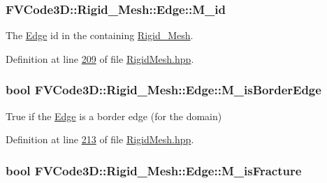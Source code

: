 \subsubsection[{\texorpdfstring{M\+\_\+id}{M_id}}]{ F\+V\+Code3\+D\+::\+Rigid\+\_\+\+Mesh\+::\+Edge\+::\+M\+\_\+id\hspace{0.3cm}{\ttfamily [protected]}}\hypertarget{classFVCode3D_1_1Rigid__Mesh_1_1Edge_a534f18f2319df147a43ee837d41dddfe}{}\label{classFVCode3D_1_1Rigid__Mesh_1_1Edge_a534f18f2319df147a43ee837d41dddfe}


The \hyperlink{classFVCode3D_1_1Rigid__Mesh_1_1Edge}{Edge} id in the containing \hyperlink{classFVCode3D_1_1Rigid__Mesh}{Rigid\+\_\+\+Mesh}. 



Definition at line \hyperlink{RigidMesh_8hpp_source_l00209}{209} of file \hyperlink{RigidMesh_8hpp_source}{Rigid\+Mesh.\+hpp}.

\subsubsection[{\texorpdfstring{M\+\_\+is\+Border\+Edge}{M_isBorderEdge}}]{\setlength{\rightskip}{0pt plus 5cm}bool F\+V\+Code3\+D\+::\+Rigid\+\_\+\+Mesh\+::\+Edge\+::\+M\+\_\+is\+Border\+Edge\hspace{0.3cm}{\ttfamily [protected]}}\hypertarget{classFVCode3D_1_1Rigid__Mesh_1_1Edge_af97600008d97c4db6f57fba531d8cd5c}{}\label{classFVCode3D_1_1Rigid__Mesh_1_1Edge_af97600008d97c4db6f57fba531d8cd5c}


True if the \hyperlink{classFVCode3D_1_1Rigid__Mesh_1_1Edge}{Edge} is a border edge (for the domain) 



Definition at line \hyperlink{RigidMesh_8hpp_source_l00213}{213} of file \hyperlink{RigidMesh_8hpp_source}{Rigid\+Mesh.\+hpp}.

\subsubsection[{\texorpdfstring{M\+\_\+is\+Fracture}{M_isFracture}}]{\setlength{\rightskip}{0pt plus 5cm}bool F\+V\+Code3\+D\+::\+Rigid\+\_\+\+Mesh\+::\+Edge\+::\+M\+\_\+is\+Fracture\hspace{0.3cm}{\ttfamily [protected]}}\hypertarget{classFVCode3D_1_1Rigid__Mesh_1_1Edge_ae0356f38073c9139078e3caa7a87c587}{}\label{classFVCode3D_1_1Rigid__Mesh_1_1Edge_ae0356f38073c9139078e3caa7a87c587}


